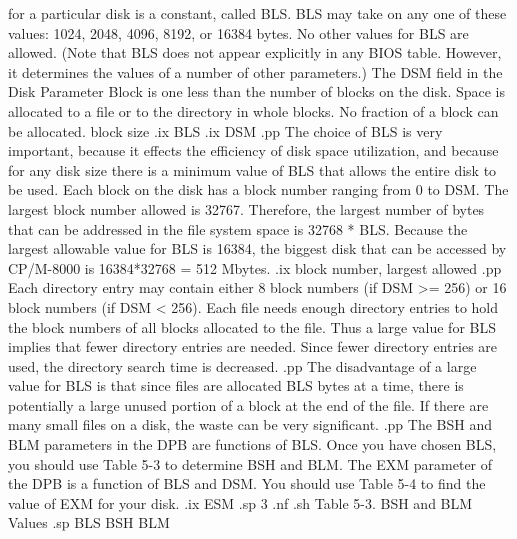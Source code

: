 for a particular disk is a constant, called BLS.  BLS may take on any
one of these values: 1024, 2048, 4096, 8192, or 16384 bytes.  No other
values for BLS are allowed.  (Note that BLS does not appear explicitly in
any BIOS table.  However, it determines the values of a number of other
parameters.)  The DSM field in the Disk Parameter Block is one less than
the number of blocks on the disk.  Space is allocated to a file 
or to the directory in 
whole blocks.  No fraction of a block can be allocated.
block size
.ix BLS
.ix DSM
.pp
The choice of BLS is very important, because it effects the efficiency of
disk space utilization, and because for any disk size there is a minimum
value of BLS that allows the entire disk to be used.
Each block on the disk has a block number ranging from 0 to DSM.  The largest
block number allowed is 32767.  Therefore, the largest number of bytes that
can be addressed in the file system space is 32768 * BLS.  Because the largest
allowable value for BLS is 16384, the biggest disk that can be accessed by
CP/M-8000 is 16384*32768 = 512 Mbytes.  
.ix block number, largest allowed
.pp
Each directory entry may contain either 8 block numbers (if DSM >= 256) 
or 16 block
numbers (if DSM < 256).  Each file needs enough directory entries to hold
the block numbers of all blocks allocated to the file.  Thus a large value 
for BLS implies that fewer directory entries are needed.  Since fewer 
directory entries are used, the directory search time is decreased.
.pp
The disadvantage of a large value for BLS is that since files are allocated
BLS bytes at a time, there is potentially a large unused portion of a block
at the end of the file.  If there are many small files on a disk, the waste
can be very significant.  
.pp
The BSH and BLM parameters in the DPB are functions of BLS.  Once you have
chosen BLS, you should use Table 5-3 to determine BSH and BLM.  The EXM 
parameter of the DPB is a function of BLS and DSM.  You should use Table 5-4
to find the value of EXM for your disk.
.ix ESM
.sp 3
.nf
.sh
                 Table 5-3.   BSH and BLM Values
.sp
                  BLS          BSH          BLM

